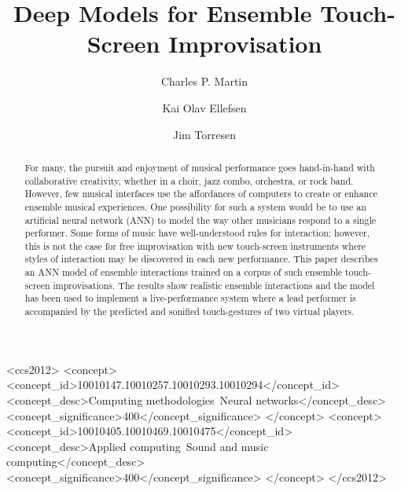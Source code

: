 \documentclass[sigchi]{acmart} %
\begin{document}

\title{Deep Models for Ensemble Touch-Screen Improvisation}

\author{Charles P. Martin}

\author{Kai Olav Ellefsen}

\author{Jim Torresen}

\begin{abstract}
  For many, the pursuit and enjoyment of musical performance goes hand-in-hand with collaborative creativity, whether in a choir, jazz combo, orchestra, or rock band. However, few musical interfaces use the affordances of computers to create or enhance ensemble musical experiences. One possibility for such a system would be to use an artificial neural network (ANN) to model the way other musicians respond to a single performer. Some forms of music have well-understood rules for interaction; however, this is not the case for free improvisation with new touch-screen instruments where styles of interaction may be discovered in each new performance. This paper describes an ANN model of ensemble interactions trained on a corpus of such ensemble touch-screen improvisations. The results show realistic ensemble interactions and the model has been used to implement a live-performance system where a lead performer is accompanied by the predicted and sonified touch-gestures of two virtual players.
\end{abstract}

\begin{CCSXML}
<ccs2012>
<concept>
<concept_id>10010147.10010257.10010293.10010294</concept_id>
<concept_desc>Computing methodologies~Neural networks</concept_desc>
<concept_significance>400</concept_significance>
</concept>
<concept>
<concept_id>10010405.10010469.10010475</concept_id>
<concept_desc>Applied computing~Sound and music computing</concept_desc>
<concept_significance>400</concept_significance>
</concept>
</ccs2012>
\end{CCSXML}
\end{document}
